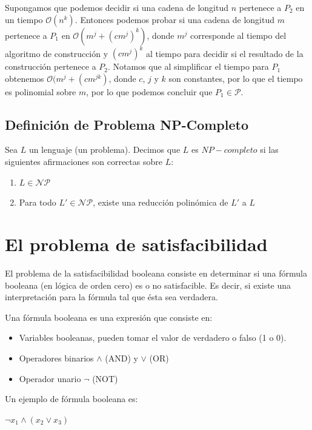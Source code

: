 \documentclass[a4paper]{article}
\begin{document}
Supongamos que podemos decidir si una cadena de longitud $n$ pertenece a $P_2$
en un tiempo $\mathcal{O}(n^{k})$. Entonces podemos probar si una cadena de
longitud $m$ pertenece a $P_1$ en $\mathcal{O}(m^j + (cm^j)^k)$,
donde $m^j$ corresponde al tiempo del algoritmo de construcción y $(cm^j)^k$ al
tiempo para decidir si el resultado de la construcción pertenece a $P_2$.
Notamos que al simplificar el tiempo para $P_1$ obtenemos
$\mathcal{O}(m^j + (cm^{jk})$, donde $c$, $j$ y $k$ son constantes, por lo que
el tiempo es polinomial sobre $m$, por lo que podemos concluir que $P_1 \in \mathcal{P}$.

\subsection{Definición de Problema NP-Completo}
Sea $L$ un lenguaje (un problema). Decimos que $L$ es $NP-completo$ si las
siguientes afirmaciones son correctas sobre $L$:
\begin{enumerate}
  \item $L \in \mathcal{NP}$
  \item Para todo $L' \in \mathcal{NP}$, existe una reducción polinómica de $L'$ a $L$
\end{enumerate}


\section{El problema de satisfacibilidad}
El problema de la satisfacibilidad booleana consiste en determinar si una fórmula booleana (en lógica de orden cero) es o no satisfacible. Es decir, si existe una interpretación para la fórmula tal que ésta sea verdadera.

Una fórmula booleana es una expresión que consiste en:

\begin{itemize}
  \item Variables booleanas, pueden tomar el valor de verdadero o falso (1 o 0).
  \item Operadores binarios $\wedge$ (AND) y $\vee$ (OR)
  \item Operador unario $\neg$ (NOT)
\end{itemize}


Un ejemplo de fórmula booleana es:



$\neg x_{1} \wedge (x_{2}\vee x_{3})$
\end{document}
